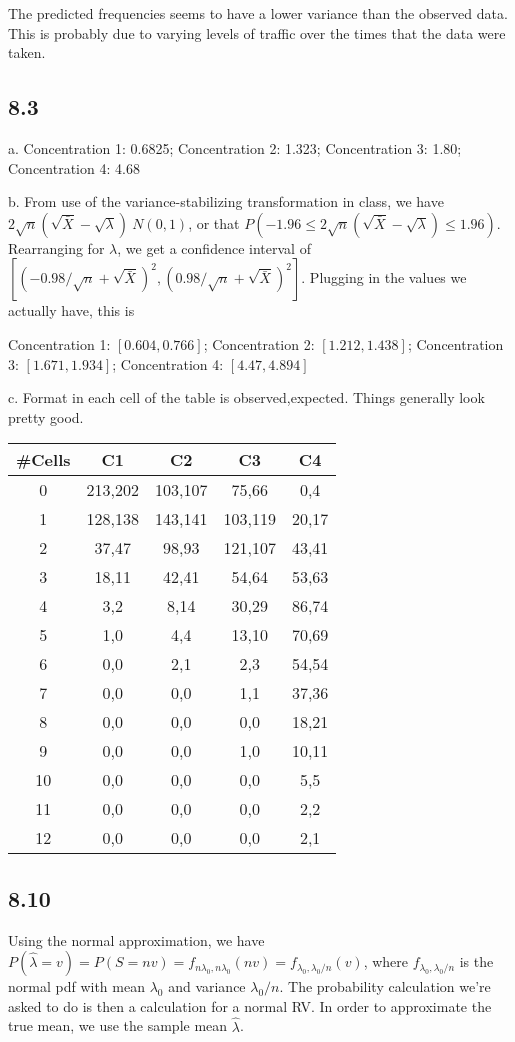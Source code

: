 \documentclass{article}
\begin{document}
The predicted frequencies seems to have a lower variance than the observed data. This is probably due to varying levels of traffic over the times that the data were taken.

\subsection*{8.3}
a. Concentration 1: 0.6825; Concentration 2: 1.323; Concentration 3: 1.80; Concentration 4: 4.68

b. From use of the variance-stabilizing transformation in class, we have $2\sqrt{n}(\sqrt{\bar{X}}-\sqrt{\lambda})~N(0,1)$, or that $P(-1.96\leq 2\sqrt{n}(\sqrt{\bar{X}}-\sqrt{\lambda})\leq1.96)$. Rearranging for $\lambda$, we get a confidence interval of $[(-0.98/\sqrt{n}+\sqrt{\bar{X}})^2,(0.98/\sqrt{n}+\sqrt{\bar{X}})^2]$. Plugging in the values we actually have, this is 

Concentration 1: $[0.604,0.766]$; Concentration 2: $[1.212,1.438]$; Concentration 3: $[1.671,1.934]$; Concentration 4: $[4.47,4.894]$

c. Format in each cell of the table is observed,expected. Things generally look pretty good.

\small
\begin{tabular}{c|c|c|c|c}
\hline
\#Cells & C1 & C2 & C3 & C4\\
\hline
0 & 213,202 & 103,107 & 75,66 & 0,4 \\
1 & 128,138 & 143,141 & 103,119 & 20,17 \\
2 & 37,47 & 98,93 & 121,107 & 43,41 \\
3 & 18,11 & 42,41 & 54,64 & 53,63 \\
4 & 3,2 & 8,14 & 30,29 & 86,74 \\
5 & 1,0 & 4,4 & 13,10 & 70,69 \\
6 & 0,0 & 2,1 & 2,3 & 54,54 \\
7 & 0,0 & 0,0 & 1,1 & 37,36 \\
8 & 0,0 & 0,0 & 0,0 & 18,21 \\
9 & 0,0 & 0,0 & 1,0 & 10,11 \\
10 & 0,0 & 0,0 & 0,0 & 5,5 \\
11 & 0,0 & 0,0 & 0,0 & 2,2 \\
12 & 0,0 & 0,0 & 0,0 & 2,1 \\
\hline
\end{tabular}
\normalsize
\subsection*{8.10}
Using the normal approximation, we have $P(\hat{\lambda}=v)=P(S=nv)=f_{n\lambda_0,n\lambda_0}(nv)=f_{\lambda_0,\lambda_0/n}(v)$, where $f_{\lambda_0,\lambda_0/n}$ is the normal pdf with mean $\lambda_0$ and variance $\lambda_0/n$. The probability calculation we're asked to do is then a calculation for a normal RV. In order to approximate the true mean, we use the sample mean $\hat{\lambda}$.
\end{document}
